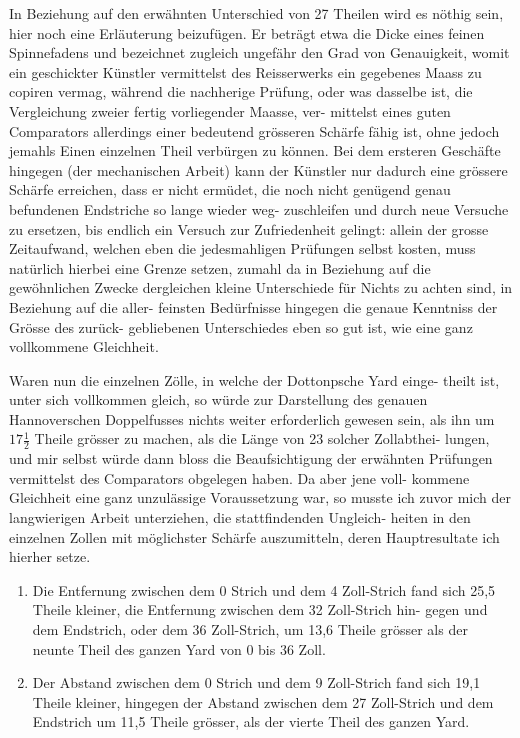 \documentclass[12pt,a4paper]{article}
\theoremstyle{plain}
\theoremstyle{definition}
\theoremstyle{remark}
\begin{document}
In Beziehung auf den erw\"ahnten Unterschied von 27 Theilen wird es
n\"othig sein, hier noch eine Erl\"auterung beizuf\"ugen. Er betr\"agt etwa die Dicke
eines feinen Spinnefadens und bezeichnet zugleich ungef\"ahr den Grad von
Genauigkeit, womit ein geschickter K\"unstler vermittelst des Reisserwerks ein
gegebenes Maass zu copiren vermag, w\"ahrend die nachherige Pr\"ufung, oder
was dasselbe ist, die Vergleichung zweier fertig vorliegender Maasse, ver-
mittelst eines guten Comparators allerdings einer bedeutend gr\"osseren Sch\"arfe
f\"ahig ist, ohne jedoch jemahls Einen einzelnen Theil verb\"urgen zu k\"onnen.
Bei dem ersteren Gesch\"afte hingegen (der mechanischen Arbeit) kann der
K\"unstler nur dadurch eine gr\"ossere Sch\"arfe erreichen, dass er nicht erm\"udet,
die noch nicht gen\"ugend genau befundenen Endstriche so lange wieder weg-
zuschleifen und durch neue Versuche zu ersetzen, bis endlich ein Versuch
zur Zufriedenheit gelingt: allein der grosse Zeitaufwand, welchen eben die
jedesmahligen Pr\"ufungen selbst kosten, muss nat\"urlich hierbei eine Grenze
setzen, zumahl da in Beziehung auf die gew\"ohnlichen Zwecke dergleichen
kleine Unterschiede f\"ur Nichts zu achten sind, in Beziehung auf die aller-
feinsten Bed\"urfnisse hingegen die genaue Kenntniss der Gr\"osse des zur\"uck-
gebliebenen Unterschiedes eben so gut ist, wie eine ganz vollkommene Gleichheit.

Waren nun die einzelnen Z\"olle, in welche der Dottonpsche Yard einge-
theilt ist, unter sich vollkommen gleich, so w\"urde zur Darstellung des genauen
Hannoverschen Doppelfusses nichts weiter erforderlich gewesen sein, als ihn
um $17\frac{1}{2}$ Theile gr\"osser zu machen, als die L\"ange von 23 solcher Zollabthei-
lungen, und mir selbst w\"urde dann bloss die Beaufsichtigung der erw\"ahnten
Pr\"ufungen vermittelst des Comparators obgelegen haben. Da aber jene voll-
kommene Gleichheit eine ganz unzul\"assige Voraussetzung war, so musste ich
zuvor mich der langwierigen Arbeit unterziehen, die stattfindenden Ungleich-
heiten in den einzelnen Zollen mit m\"oglichster Sch\"arfe auszumitteln, deren
Hauptresultate ich hierher setze.

\begin{enumerate}[label=\arabic*.]
\item Die Entfernung zwischen dem 0 Strich und dem 4 Zoll-Strich fand
sich 25,5 Theile kleiner, die Entfernung zwischen dem 32 Zoll-Strich hin-
gegen und dem Endstrich, oder dem 36 Zoll-Strich, um 13,6 Theile gr\"osser
als der neunte Theil des ganzen Yard von 0 bis 36 Zoll.

\item Der Abstand zwischen dem 0 Strich und dem 9 Zoll-Strich fand
sich 19,1 Theile kleiner, hingegen der Abstand zwischen dem 27 Zoll-Strich
und dem Endstrich um 11,5 Theile gr\"osser, als der vierte Theil des ganzen
Yard.
\end{enumerate}
\end{document}
